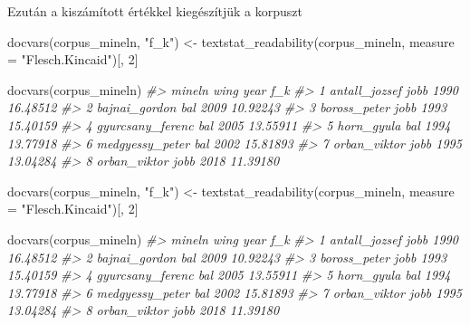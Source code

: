 \documentclass[
]{book}
\newenvironment{Shaded}{\begin{snugshade}}{\end{snugshade}}
\newcommand{\AttributeTok}[1]{\textcolor[rgb]{0.77,0.63,0.00}{#1}}
\newcommand{\CommentTok}[1]{\textcolor[rgb]{0.56,0.35,0.01}{\textit{#1}}}
\newcommand{\DecValTok}[1]{\textcolor[rgb]{0.00,0.00,0.81}{#1}}
\newcommand{\FunctionTok}[1]{\textcolor[rgb]{0.00,0.00,0.00}{#1}}
\newcommand{\NormalTok}[1]{#1}
\newcommand{\OtherTok}[1]{\textcolor[rgb]{0.56,0.35,0.01}{#1}}
\newcommand{\StringTok}[1]{\textcolor[rgb]{0.31,0.60,0.02}{#1}}
\begin{document}
Ezután a kiszámított értékkel kiegészítjük a korpuszt

\begin{Shaded}
\begin{Highlighting}[]
\FunctionTok{docvars}\NormalTok{(corpus\_mineln, }\StringTok{"f\_k"}\NormalTok{) }\OtherTok{\textless{}{-}} \FunctionTok{textstat\_readability}\NormalTok{(corpus\_mineln, }\AttributeTok{measure =} \StringTok{"Flesch.Kincaid"}\NormalTok{)[, }
    \DecValTok{2}\NormalTok{]}

\FunctionTok{docvars}\NormalTok{(corpus\_mineln)}
\CommentTok{\#\textgreater{}             mineln wing year      f\_k}
\CommentTok{\#\textgreater{} 1    antall\_jozsef jobb 1990 16.48512}
\CommentTok{\#\textgreater{} 2    bajnai\_gordon  bal 2009 10.92243}
\CommentTok{\#\textgreater{} 3     boross\_peter jobb 1993 15.40159}
\CommentTok{\#\textgreater{} 4 gyurcsany\_ferenc  bal 2005 13.55911}
\CommentTok{\#\textgreater{} 5       horn\_gyula  bal 1994 13.77918}
\CommentTok{\#\textgreater{} 6  medgyessy\_peter  bal 2002 15.81893}
\CommentTok{\#\textgreater{} 7     orban\_viktor jobb 1995 13.04284}
\CommentTok{\#\textgreater{} 8     orban\_viktor jobb 2018 11.39180}
\end{Highlighting}
\end{Shaded}

\begin{Shaded}
\begin{Highlighting}[]
\FunctionTok{docvars}\NormalTok{(corpus\_mineln, }\StringTok{"f\_k"}\NormalTok{) }\OtherTok{\textless{}{-}} \FunctionTok{textstat\_readability}\NormalTok{(corpus\_mineln, }\AttributeTok{measure =} \StringTok{"Flesch.Kincaid"}\NormalTok{)[, }
    \DecValTok{2}\NormalTok{]}

\FunctionTok{docvars}\NormalTok{(corpus\_mineln)}
\CommentTok{\#\textgreater{}             mineln wing year      f\_k}
\CommentTok{\#\textgreater{} 1    antall\_jozsef jobb 1990 16.48512}
\CommentTok{\#\textgreater{} 2    bajnai\_gordon  bal 2009 10.92243}
\CommentTok{\#\textgreater{} 3     boross\_peter jobb 1993 15.40159}
\CommentTok{\#\textgreater{} 4 gyurcsany\_ferenc  bal 2005 13.55911}
\CommentTok{\#\textgreater{} 5       horn\_gyula  bal 1994 13.77918}
\CommentTok{\#\textgreater{} 6  medgyessy\_peter  bal 2002 15.81893}
\CommentTok{\#\textgreater{} 7     orban\_viktor jobb 1995 13.04284}
\CommentTok{\#\textgreater{} 8     orban\_viktor jobb 2018 11.39180}
\end{Highlighting}
\end{Shaded}
\end{document}
